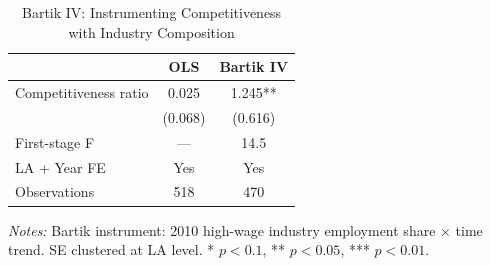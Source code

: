 \begin{table}[htbp]
\centering
\caption{Bartik IV: Instrumenting Competitiveness with Industry Composition}
\label{tab:iv}
\begin{tabular}{lcc}
\toprule
 & OLS & Bartik IV \\
\midrule
Competitiveness ratio & 0.025 & 1.245** \\
 & (0.068) & (0.616) \\
\midrule
First-stage F & --- & 14.5 \\
LA + Year FE & Yes & Yes \\
Observations & 518 & 470 \\
\bottomrule
\end{tabular}
\begin{tablenotes}[flushleft]
\small
\item \textit{Notes:} Bartik instrument: 2010 high-wage industry employment share $\times$ time trend. SE clustered at LA level. * $p<0.1$, ** $p<0.05$, *** $p<0.01$.
\end{tablenotes}
\end{table}
